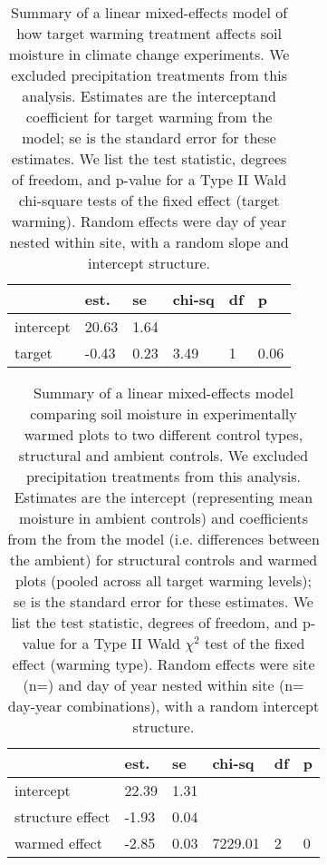 \documentclass{article}
\begin{document}
\begin{table}[ht]
\centering
\caption{Summary of a linear mixed-effects model of how target warming treatment affects soil moisture in climate change experiments. We excluded precipitation treatments from this analysis. Estimates are the interceptand coefficient for target warming from the model; se is the standard error for these estimates. We list the test statistic, degrees of freedom, and p-value for a Type II Wald chi-square tests of the fixed effect (target warming). Random effects were day of year nested within site, with a random slope and intercept structure.} 
\label{table:targsoilmois}
\begin{tabular}{|p{}|p{}p{}p{}p{}p{}|}
  \hline
 & est. & se & chi-sq & df & p \\ 
  \hline
intercept & 20.63 & 1.64 &  &  &  \\ 
  target & -0.43 & 0.23 & 3.49 & 1 & 0.06 \\ 
   \hline
\end{tabular}
\end{table}%
\begin{table}[ht]
\centering
\caption{Summary of a linear mixed-effects model comparing soil moisture in experimentally warmed plots to two different control types, structural and ambient controls. We excluded precipitation treatments from this analysis. Estimates are the intercept (representing mean moisture in ambient controls)  and coefficients from the from the model (i.e. differences between the ambient) for structural controls and warmed plots (pooled across all target warming levels); se is the standard error for these estimates. We list the test statistic, degrees of freedom, and p-value for a Type II Wald $\chi^{2}$ test of the fixed effect (warming type). Random effects were site (n=) and day of year nested within site (n= day-year combinations), with a random intercept structure.} 
\label{table:warmsoilmois}
\begin{tabular}{|p{}|p{}p{}p{}p{}p{}|}
  \hline
 & est. & se & chi-sq & df & p \\ 
  \hline
intercept & 22.39 & 1.31 &  &  &  \\ 
  structure effect & -1.93 & 0.04 &  &  &  \\ 
  warmed effect & -2.85 & 0.03 & 7229.01 & 2 & 0 \\ 
   \hline
\end{tabular}
\end{table}
\end{document}
